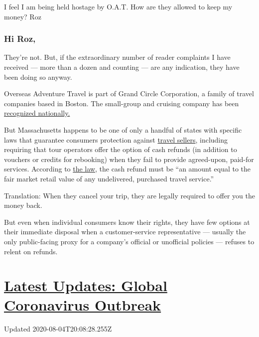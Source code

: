 I feel I am being held hostage by O.A.T. How are they allowed to keep my
money? Roz

\hypertarget{hi-roz}{%
\subsubsection{Hi Roz,}\label{hi-roz}}

They're not. But, if the extraordinary number of reader complaints I
have received --- more than a dozen and counting --- are any indication,
they have been doing so anyway.

Overseas Adventure Travel is part of Grand Circle Corporation, a family
of travel companies based in Boston. The small-group and cruising
company has been
\href{https://www.oattravel.com/oat-difference/awards}{recognized
nationally.}

But Massachusetts happens to be one of only a handful of states with
specific laws that guarantee consumers protection against
\href{https://www.mass.gov/doc/940-cmr-15-the-sale-of-travel-services/download}{travel
sellers}, including requiring that tour operators offer the option of
cash refunds (in addition to vouchers or credits for rebooking) when
they fail to provide agreed-upon, paid-for services. According to
\href{https://www.mass.gov/doc/940-cmr-15-the-sale-of-travel-services/download}{the
law,} the cash refund must be ``an amount equal to the fair market
retail value of any undelivered, purchased travel service.''

Translation: When they cancel your trip, they are legally required to
offer you the money back.

But even when individual consumers know their rights, they have few
options at their immediate disposal when a customer-service
representative --- usually the only public-facing proxy for a company's
official or unofficial policies --- refuses to relent on refunds.

\hypertarget{latest-updates-global-coronavirus-outbreak}{%
\section{\texorpdfstring{\href{https://www.nytimes.com/2020/08/04/world/coronavirus-cases.html?action=click\&pgtype=Article\&state=default\&region=MAIN_CONTENT_1\&context=storylines_live_updates}{Latest
Updates: Global Coronavirus
Outbreak}}{Latest Updates: Global Coronavirus Outbreak}}\label{latest-updates-global-coronavirus-outbreak}}

Updated 2020-08-04T20:08:28.255Z

